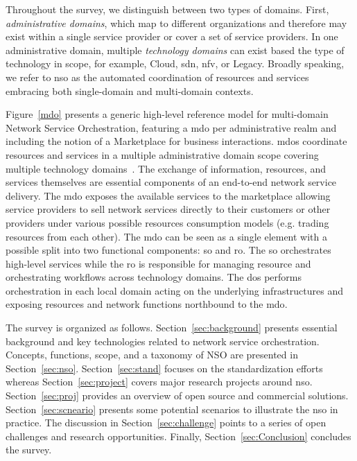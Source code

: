 Throughout the survey, we distinguish between two types of domains. First, \textit{administrative domains}, which map to different organizations and therefore may exist within a single service provider or cover a set of service providers. In one administrative domain, multiple \textit{technology domains} can exist based the type of technology in scope, for example, Cloud, \gls{sdn}, \gls{nfv}, or Legacy. 
Broadly speaking, we refer to \gls{nso} as the automated coordination of resources and services embracing both single-domain and multi-domain contexts.  

Figure~\ref{mdo} presents a generic high-level reference model for multi-domain Network Service Orchestration, featuring  a \gls{mdo} per administrative realm and including the notion of a Marketplace for business interactions. 
\glspl{mdo} coordinate resources and services in a multiple administrative domain scope covering multiple technology domains~\cite{5GPPPArchitectureWorkingGroup2016ViewArchitecture}. 
The exchange of information, resources, and services themselves are essential components of an  end-to-end network service delivery.  The \gls{mdo} exposes the available services to the marketplace allowing service providers to sell network services directly to their customers or other providers under various possible resources consumption models (e.g. trading resources from each other). 
The \gls{mdo} can be seen as a single element with a possible split into two functional components: \gls{so} and \gls{ro}. The \gls{so} orchestrates high-level services while the \gls{ro} is responsible for managing resource and orchestrating workflows  across technology domains. 
The \glspl{do} performs orchestration in each local domain acting on the underlying infrastructures and exposing resources and network functions northbound to the \gls{mdo}. 

The survey is organized as follows. Section~\ref{sec:background} presents essential background and  key technologies related to network service orchestration. Concepts, functions, scope, and a taxonomy of NSO are presented in Section~\ref{sec:nso}. Section~\ref{sec:stand} focuses on the standardization efforts whereas Section~\ref{sec:project} covers major research projects around \gls{nso}. Section~\ref{sec:proj} provides an overview of open source and commercial solutions. Section~\ref{sec:scneario} presents some potential scenarios to illustrate the \gls{nso} in practice. The discussion in Section~\ref{sec:challenge} points to a series of open challenges and research opportunities. Finally, Section~\ref{sec:Conclusion} concludes the survey.
